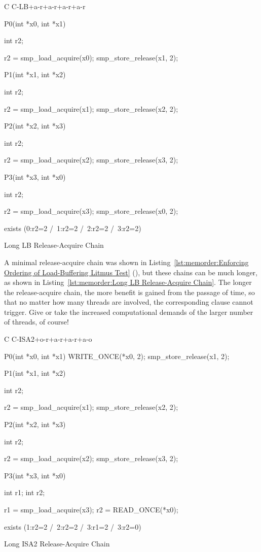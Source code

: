 \begin{listing}[tbp]
{ \scriptsize
\begin{verbbox}[\LstLineNo]
C C-LB+a-r+a-r+a-r+a-r
{
}

P0(int *x0, int *x1)
{
  int r2;

  r2 = smp_load_acquire(x0);
  smp_store_release(x1, 2);
}


P1(int *x1, int *x2)
{
  int r2;

  r2 = smp_load_acquire(x1);
  smp_store_release(x2, 2);
}

P2(int *x2, int *x3)
{
  int r2;

  r2 = smp_load_acquire(x2);
  smp_store_release(x3, 2);
}

P3(int *x3, int *x0)
{
  int r2;

  r2 = smp_load_acquire(x3);
  smp_store_release(x0, 2);
}

exists (0:r2=2 /\ 1:r2=2 /\ 2:r2=2 /\ 3:r2=2)
\end{verbbox}
}
\centering
\theverbbox
\caption{Long LB Release-Acquire Chain}
\label{lst:memorder:Long LB Release-Acquire Chain}
\end{listing}

A minimal release-acquire chain was shown in
Listing~\ref{lst:memorder:Enforcing Ordering of Load-Buffering Litmus Test}
(),
but these chains can be much longer, as shown in
Listing~\ref{lst:memorder:Long LB Release-Acquire Chain}.
The longer the release-acquire chain, the more benefit is gained
from the passage of time, so that no matter how many threads are
involved, the corresponding  clause cannot trigger.
Give or take the increased computational demands of the larger number
of threads, of course!

\begin{listing}[tbp]
{ \scriptsize
\begin{verbbox}[\LstLineNo]
C C-ISA2+o-r+a-r+a-r+a-o
{
}

P0(int *x0, int *x1)
{
  WRITE_ONCE(*x0, 2);
  smp_store_release(x1, 2);
}


P1(int *x1, int *x2)
{
  int r2;

  r2 = smp_load_acquire(x1);
  smp_store_release(x2, 2);
}

P2(int *x2, int *x3)
{
  int r2;

  r2 = smp_load_acquire(x2);
  smp_store_release(x3, 2);
}

P3(int *x3, int *x0)
{
  int r1;
  int r2;

  r1 = smp_load_acquire(x3);
  r2 = READ_ONCE(*x0);
}

exists (1:r2=2 /\ 2:r2=2 /\ 3:r1=2 /\ 3:r2=0)
\end{verbbox}
}
\centering
\theverbbox
\caption{Long ISA2 Release-Acquire Chain}
\label{lst:memorder:Long ISA2 Release-Acquire Chain}
\end{listing}

